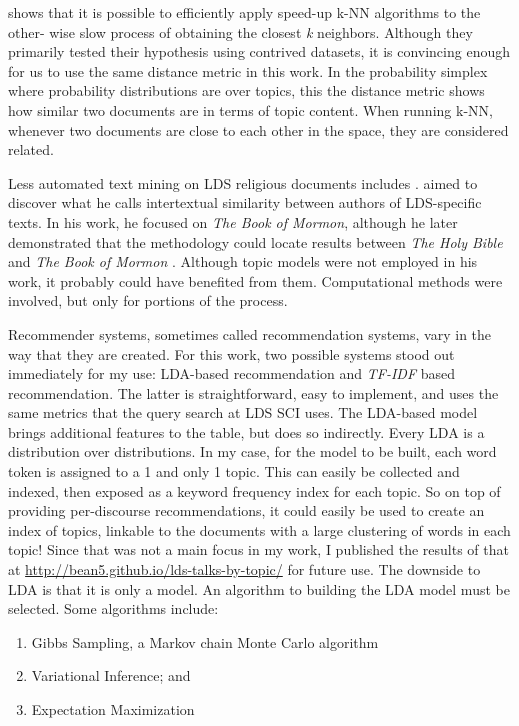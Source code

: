 \cite{Krstovski2013efficient} %
shows that it is possible to efficiently apply speed-up k-NN algorithms to the other- wise slow process of obtaining the closest \emph{k} neighbors. Although they primarily tested their hypothesis using contrived datasets, it is convincing enough for us to use the same distance metric in this work. In the probability simplex where probability distributions are over topics, this the distance metric shows how similar two documents are in terms of topic content. When running k-NN, whenever two documents are close to each other in the space, they are considered related.

Less automated text mining on LDS religious documents includes \citep{hilton:2008:abinadi} %
. \citeauthor{hilton:2008:abinadi} aimed to discover what he calls intertextual similarity between authors of LDS-specific texts. In his work, he focused on \emph{The Book of Mormon}, although he later demonstrated that the methodology could locate results between \emph{The Holy Bible} and \emph{The Book of Mormon} \citep{hilton:2013:psalms}. Although topic models were not employed in his work, it probably could have benefited from them. Computational methods were involved, but only for portions of the process.

Recommender systems, sometimes called recommendation systems, vary in the way that they are created. For this work, two possible systems stood out immediately for my use: LDA-based recommendation and \emph{TF-IDF} based recommendation. The latter is straightforward, easy to implement, and uses the same metrics that the query search at LDS SCI uses. The LDA-based model brings additional features to the table, but does so indirectly. Every LDA is a distribution over distributions. In my case, for the model to be built, each word token is assigned to a 1 and only 1 topic. This can easily be collected and indexed, then exposed as a keyword frequency index for each topic. So on top of providing per-discourse recommendations, it could easily be used to create an index of topics, linkable to the documents with a large clustering of words in each topic! Since that was not a main focus in my work, I published the results of that at \url{http://bean5.github.io/lds-talks-by-topic/} for future use. The downside to LDA is that it is only a model. An algorithm to building the LDA model must be selected. Some algorithms include:

\begin{enumerate}
  \item Gibbs Sampling, a Markov chain Monte Carlo algorithm
  \item Variational Inference; and
  \item Expectation Maximization
\end{enumerate}

